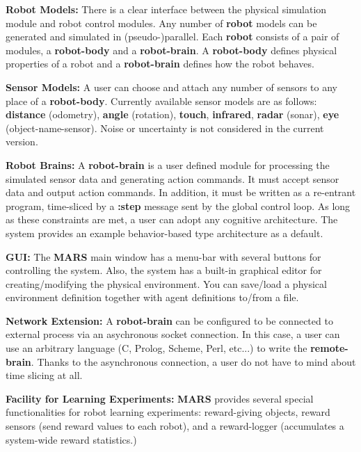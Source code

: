 {\bf Robot Models:}
There is a clear interface between the physical simulation module and
robot control modules. Any number of {\bf robot} models can be
generated and simulated in (pseudo-)parallel.
Each {\bf robot} consists of a pair of modules,
a {\bf robot-body} and a {\bf robot-brain}.
A {\bf robot-body} defines physical properties of a robot and a {\bf
robot-brain} defines how the robot behaves.

{\bf Sensor Models:}
A user can choose and attach any number of sensors to any place of a
{\bf robot-body}. Currently available sensor models are as follows:
{\bf distance} (odometry), {\bf angle} (rotation), {\bf touch}, {\bf
infrared}, {\bf radar} (sonar), {\bf eye} (object-name-sensor).
Noise or uncertainty is not considered in the current version.

{\bf Robot Brains:}
A {\bf robot-brain} is a user defined module for processing the
simulated sensor data and generating action commands.
It must accept sensor data and output action commands. In addition, it
must be written as a re-entrant program, time-sliced by a {\bf :step}
message sent by the global control loop.
As long as these constraints are met, a user can adopt any cognitive
architecture. The system provides an example behavior-based type
architecture as a default.

{\bf GUI:}
The {\bf MARS} main window has a menu-bar with several buttons for
controlling the system. Also, the system has a built-in graphical
editor for creating/modifying the physical environment.
You can save/load a physical environment definition together with
agent definitions to/from a file.

{\bf Network Extension:}
A {\bf robot-brain} can be configured to be connected to external
process via an asychronous socket connection. In this case, a user can
use an arbitrary language (C, Prolog, Scheme, Perl, etc...) to write
the {\bf remote-brain}. Thanks to the asynchronous connection, a user
do not have to mind about time slicing at all.

{\bf Facility for Learning Experiments:}
{\bf MARS} provides several special functionalities for robot learning
experiments: reward-giving objects, reward sensors (send reward values
to each robot), and a reward-logger (accumulates a system-wide reward
statistics.)

